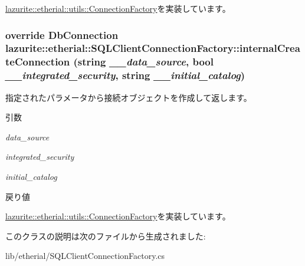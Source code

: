 \hyperlink{classlazurite_1_1etherial_1_1utils_1_1_connection_factory_a21c31b431a87b330f8a7030140059861}{lazurite::etherial::utils::ConnectionFactory}を実装しています。\hypertarget{classlazurite_1_1etherial_1_1_s_q_l_client_connection_factory_ae90709eac75512aafebd8d81290e8100}{
\subsubsection[{internalCreateConnection}]{\setlength{\rightskip}{0pt plus 5cm}override DbConnection lazurite::etherial::SQLClientConnectionFactory::internalCreateConnection (string {\em \_\-\_\-data\_\-source}, \/  bool {\em \_\-\_\-integrated\_\-security}, \/  string {\em \_\-\_\-initial\_\-catalog})}}
\label{classlazurite_1_1etherial_1_1_s_q_l_client_connection_factory_ae90709eac75512aafebd8d81290e8100}


指定されたパラメータから接続オブジェクトを作成して返します。 
\begin{DoxyParams}{引数}
\item[{\em data\_\-source}]\item[{\em integrated\_\-security}]\item[{\em initial\_\-catalog}]\end{DoxyParams}
\begin{DoxyReturn}{戻り値}

\end{DoxyReturn}


\hyperlink{classlazurite_1_1etherial_1_1utils_1_1_connection_factory_adc19f91b5686f5a21af75a180bab6db3}{lazurite::etherial::utils::ConnectionFactory}を実装しています。

このクラスの説明は次のファイルから生成されました:\begin{DoxyCompactItemize}
\item 
lib/etherial/SQLClientConnectionFactory.cs\end{DoxyCompactItemize}
